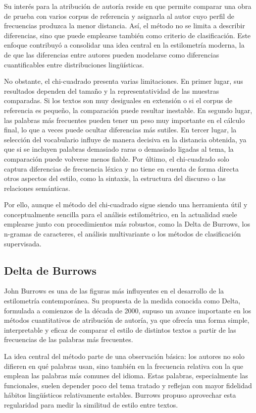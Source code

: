 \documentclass[IB]{TFUOC}%
\begin{document}
Su interés para la atribución de autoría reside en que permite comparar una obra de prueba con varios corpus de referencia y asignarla al autor cuyo perfil de frecuencias produzca la menor distancia. Así, el método no se limita a describir diferencias, sino que puede emplearse también como criterio de clasificación. Este enfoque contribuyó a consolidar una idea central en la estilometría moderna, la de que las diferencias entre autores pueden modelarse como diferencias cuantificables entre distribuciones lingüísticas.

No obstante, el chi-cuadrado presenta varias limitaciones. En primer lugar, sus resultados dependen del tamaño y la representatividad de las muestras comparadas. Si los textos son muy desiguales en extensión o si el corpus de referencia es pequeño, la comparación puede resultar inestable. En segundo lugar, las palabras más frecuentes pueden tener un peso muy importante en el cálculo final, lo que a veces puede ocultar diferencias más sutiles. En tercer lugar, la selección del vocabulario influye de manera decisiva en la distancia obtenida, ya que si se incluyen palabras demasiado raras o demasiado ligadas al tema, la comparación puede volverse menos fiable. Por último, el chi-cuadrado solo captura diferencias de frecuencia léxica y no tiene en cuenta de forma directa otros aspectos del estilo, como la sintaxis, la estructura del discurso o las relaciones semánticas.

Por ello, aunque el método del chi-cuadrado sigue siendo una herramienta útil y conceptualmente sencilla para el análisis estilométrico, en la actualidad suele emplearse junto con procedimientos más robustos, como la Delta de Burrows, los n-gramas de caracteres, el análisis multivariante o los métodos de clasificación supervisada.

\subsection{Delta de Burrows}

John Burrows es una de las figuras más influyentes en el desarrollo de la estilometría contemporánea. Su propuesta de la medida conocida como Delta, formulada a comienzos de la década de 2000, supuso un avance importante en los métodos cuantitativos de atribución de autoría, ya que ofrecía una forma simple, interpretable y eficaz de comparar el estilo de distintos textos a partir de las frecuencias de las palabras más frecuentes\cite{burrows2002delta}.

La idea central del método parte de una observación básica: los autores no solo difieren en qué palabras usan, sino también en la frecuencia relativa con la que emplean las palabras más comunes del idioma. Estas palabras, especialmente las funcionales, suelen depender poco del tema tratado y reflejan con mayor fidelidad hábitos lingüísticos relativamente estables. Burrows propuso aprovechar esta regularidad para medir la similitud de estilo entre textos.
\end{document}
